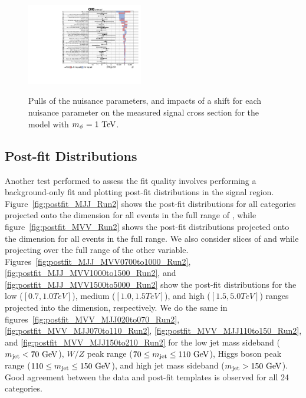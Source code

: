 \begin{figure}[htbp]
  \includegraphics[width=0.45\textwidth,page=6]{fig/fitValidation/impacts_VBFRadToWW1000_6p_72.pdf}\\
  \caption{
    Pulls of the nuisance parameters, and impacts of a shift for each nuisance parameter on the measured signal cross section for the \VBF\RadtoWW model with $m_{\Rad}=1\unit{TeV}$.
  }
  \label{fig:impacts_VBFRadToWW}
\end{figure}

\subsection{Post-fit Distributions}

Another test performed to assess the fit quality involves performing a background-only fit and plotting post-fit distributions in the signal region.
Figure~\ref{fig:postfit_MJJ_Run2} shows the post-fit distributions for all categories projected onto the \MJ dimension for all events in the full range of \MVV, while figure~\ref{fig:postfit_MVV_Run2} shows the post-fit distributions projected onto the \MVV dimension for all events in the full \MJ range.
We also consider slices of \MJ and \MVV while projecting over the full range of the other variable.
Figures~\ref{fig:postfit_MJJ_MVV0700to1000_Run2}, \ref{fig:postfit_MJJ_MVV1000to1500_Run2}, and \ref{fig:postfit_MJJ_MVV1500to5000_Run2} show the post-fit distributions for the low ($[0.7,1.0\unit{TeV}]$), medium ($[1.0,1.5\unit{TeV}]$), and high ($[1.5,5.0\unit{TeV}]$) \MVV ranges projected into the \MJ dimension, respectively.
We do the same in figures~\ref{fig:postfit_MVV_MJJ020to070_Run2}, \ref{fig:postfit_MVV_MJJ070to110_Run2}, \ref{fig:postfit_MVV_MJJ110to150_Run2}, and \ref{fig:postfit_MVV_MJJ150to210_Run2} for the low jet mass sideband ($\MJ<70\unit{GeV}$), $W/Z$ peak range ($70\leq\MJ\leq110\unit{GeV}$), Higgs boson peak range ($110\leq\MJ\leq150\unit{GeV}$), and high jet mass sideband ($\MJ>150\unit{GeV}$).
Good agreement between the data and post-fit templates is observed for all 24 categories.


